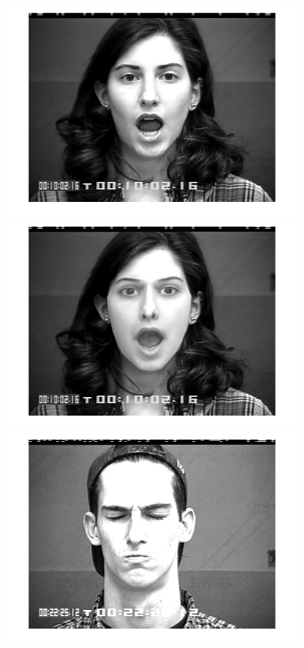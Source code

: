 \begin{figure}[!htb]
    	\includegraphics[scale=.10]{figure/77/09.png}
    	\includegraphics[scale=.10]{figure/77de/09.png}
    	\hspace{1cm}
    	\includegraphics[scale=.10]{figure/89/23.png}

\end{figure}
